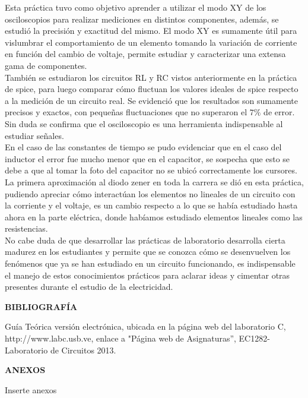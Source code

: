 \documentclass[12pt]{article}
\begin{document}
	\noindent Esta práctica tuvo como objetivo aprender a utilizar el modo XY de los osciloscopios para realizar mediciones en distintos componentes, además, se estudió la precisión y exactitud del mismo. El modo XY es sumamente útil para vislumbrar el comportamiento de un elemento tomando la variación de corriente en función del cambio de voltaje, permite estudiar y caracterizar una extensa gama de componentes.\\
	
	\noindent También se estudiaron los circuitos RL y RC vistos anteriormente en la práctica de spice, para luego comparar cómo fluctuan los valores ideales de spice respecto a la medición de un circuito real. Se evidenció que los resultados son sumamente precisos y exactos, con pequeñas fluctuaciones que no superaron el $7\%$ de error. Sin duda se confirma que el osciloscopio es una herramienta indispensable al estudiar señales.\\
	
	\noindent En el caso de las constantes de tiempo se pudo evidenciar que en el caso del inductor el error fue mucho menor que en el capacitor, se sospecha que esto se debe a que al tomar la foto del capacitor no se ubicó correctamente los cursores.\\
	
	\noindent La primera aproximación al diodo zener en toda la carrera se dió en esta práctica, pudiendo apreciar cómo interactúan los elementos no lineales de un circuito con la corriente y el voltaje, es un cambio respecto a lo que se había estudiado hasta ahora en la parte eléctrica, donde habíamos estudiado elementos lineales como las resistencias.\\
	
	\noindent No cabe duda de que desarrollar las prácticas de laboratorio desarrolla cierta madurez en los estudiantes y permite que se conozca cómo se desenvuelven los fenómenos que ya se han estudiado en un circuito funcionando, es indispensable el manejo de estos conocimientos prácticos para aclarar ideas y cimentar otras presentes durante el estudio de la electricidad.
	
	
	\newpage
	
	\begin{center}
		\textbf{\large BIBLIOGRAFÍA}\\
	\end{center}
	
	\noindent Guía Teórica versión electrónica, ubicada en la página web del laboratorio C, http://www.labc.usb.ve,
	enlace a "Página web de Asignaturas”, EC1282- Laboratorio de Circuitos 2013.
	
	\newpage
	
	\begin{center}
		\textbf{\large ANEXOS}\\
	\end{center}
	
	Inserte anexos
	
\end{document}
